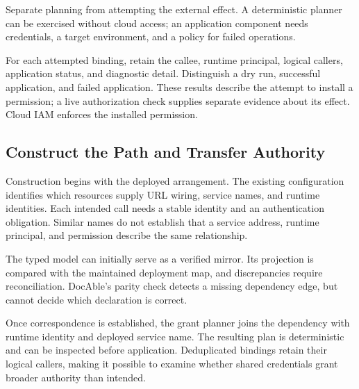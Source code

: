
Separate planning from attempting the external effect. A deterministic planner can be exercised without cloud access; an application component needs credentials, a target environment, and a policy for failed operations.

For each attempted binding, retain the callee, runtime principal, logical callers, application status, and diagnostic detail. Distinguish a dry run, successful application, and failed application. These results describe the attempt to install a permission; a live authorization check supplies separate evidence about its effect. Cloud IAM enforces the installed permission.

\subsection*{Construct the Path and Transfer Authority}

Construction begins with the deployed arrangement. The existing configuration identifies which resources supply URL wiring, service names, and runtime identities. Each intended call needs a stable identity and an authentication obligation. Similar names do not establish that a service address, runtime principal, and permission describe the same relationship.

The typed model can initially serve as a verified mirror. Its projection is compared with the maintained deployment map, and discrepancies require reconciliation. DocAble's parity check detects a missing dependency edge, but cannot decide which declaration is correct.

Once correspondence is established, the grant planner joins the dependency with runtime identity and deployed service name. The resulting plan is deterministic and can be inspected before application. Deduplicated bindings retain their logical callers, making it possible to examine whether shared credentials grant broader authority than intended.

